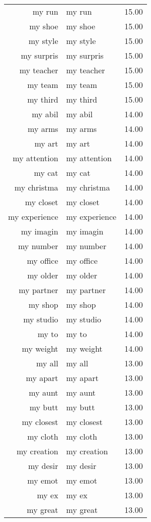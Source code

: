 \begin{table}[ht]
\begin{tabular}{rlr}
  my run & my run & 15.00 \\ 
  my shoe & my shoe & 15.00 \\ 
  my style & my style & 15.00 \\ 
  my surpris & my surpris & 15.00 \\ 
  my teacher & my teacher & 15.00 \\ 
  my team & my team & 15.00 \\ 
  my third & my third & 15.00 \\ 
  my abil & my abil & 14.00 \\ 
  my arms & my arms & 14.00 \\ 
  my art & my art & 14.00 \\ 
  my attention & my attention & 14.00 \\ 
  my cat & my cat & 14.00 \\ 
  my christma & my christma & 14.00 \\ 
  my closet & my closet & 14.00 \\ 
  my experience & my experience & 14.00 \\ 
  my imagin & my imagin & 14.00 \\ 
  my number & my number & 14.00 \\ 
  my office & my office & 14.00 \\ 
  my older & my older & 14.00 \\ 
  my partner & my partner & 14.00 \\ 
  my shop & my shop & 14.00 \\ 
  my studio & my studio & 14.00 \\ 
  my to & my to & 14.00 \\ 
  my weight & my weight & 14.00 \\ 
  my all & my all & 13.00 \\ 
  my apart & my apart & 13.00 \\ 
  my aunt & my aunt & 13.00 \\ 
  my butt & my butt & 13.00 \\ 
  my closest & my closest & 13.00 \\ 
  my cloth & my cloth & 13.00 \\ 
  my creation & my creation & 13.00 \\ 
  my desir & my desir & 13.00 \\ 
  my emot & my emot & 13.00 \\ 
  my ex & my ex & 13.00 \\ 
  my great & my great & 13.00 \\ 

\end{tabular}
\end{table}
